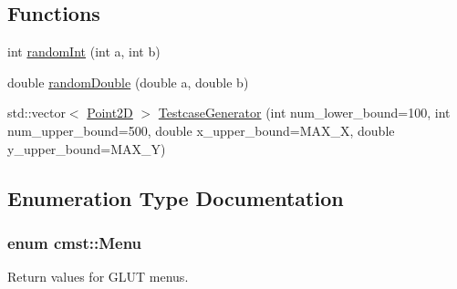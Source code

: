 \subsection*{Functions}
\begin{DoxyCompactItemize}
\item 
int \hyperlink{namespacecmst_a844037f018f3d5b7b1f1a5f4463da501}{randomInt} (int a, int b)
\item 
double \hyperlink{namespacecmst_a8df08a5847caeb65a6606968e40f336f}{randomDouble} (double a, double b)
\item 
std::vector$<$ \hyperlink{classcmst_1_1_point2_d}{Point2D} $>$ \hyperlink{namespacecmst_abd1822f67dc5d2be959508e628be0633}{TestcaseGenerator} (int num\_lower\_bound=100, int num\_upper\_bound=500, double x\_upper\_bound=MAX\_X, double y\_upper\_bound=MAX\_Y)
\end{DoxyCompactItemize}


\subsection{Enumeration Type Documentation}
\subsubsection[{\texorpdfstring{Menu}{Menu}}]{\setlength{\rightskip}{0pt plus 5cm}enum {\bf cmst::Menu}}\hypertarget{namespacecmst_a8dff7ccfde8a2770160b5f8dbf81c3b9}{}\label{namespacecmst_a8dff7ccfde8a2770160b5f8dbf81c3b9}


Return values for GLUT menus. 

